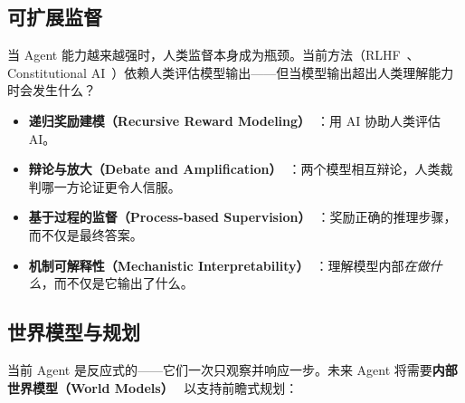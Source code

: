 \subsection{可扩展监督}
\label{scalable-oversight}

当 Agent 能力越来越强时，人类监督本身成为瓶颈。当前方法（RLHF~\cite{ouyang2022training}、Constitutional AI~\cite{bai2022constitutional}）依赖人类评估模型输出——但当模型输出超出人类理解能力时会发生什么？

\begin{itemize}
  \item \textbf{递归奖励建模（Recursive Reward Modeling）}~\cite{christiano2017deep}：用 AI 协助人类评估 AI。
  \item \textbf{辩论与放大（Debate and Amplification）}~\cite{irving2018debate}：两个模型相互辩论，人类裁判哪一方论证更令人信服。
  \item \textbf{基于过程的监督（Process-based Supervision）}~\cite{lightman2023lets}：奖励正确的推理步骤，而不仅是最终答案。
  \item \textbf{机制可解释性（Mechanistic Interpretability）}~\cite{olsson2022context}：理解模型内部\emph{在做什么}，而不仅是它输出了什么。
\end{itemize}

\subsection{世界模型与规划}
\label{world-models-and-planning}

当前 Agent 是反应式的——它们一次只观察并响应一步。未来 Agent 将需要\textbf{内部世界模型（World Models）}~\cite{hafner2020dream} 以支持前瞻式规划：

